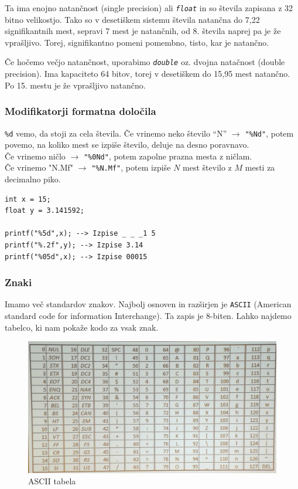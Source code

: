 \documentclass[a4paper, 12pt]{article}
\begin{document}
Ta ima enojno natančnost (single precision) ali \emph{\texttt{float}} in so števila zapisana z 32 bitno velikostjo. Tako so v desetiškem sistemu števila natančna do 7,22 signifikantnih mest, sepravi 7 mest je natančnih, od 8. števila naprej pa je že vprašljivo. Torej, signifikantno pomeni pomembno, tisto, kar je natančno.\

Če hočemo večjo natančnost, uporabimo \emph{\texttt{double}} oz. dvojna natačnost (double precision). Ima kapaciteto 64 bitov, torej v desetiškem do 15,95 mest natančno. Po 15. mestu je že vprašljivo natančno.


\subsubsection{Modifikatorji formatna določila}
\verb|%d| vemo, da stoji za cela števila. Če vrinemo neko število ``N'' $\to$ \texttt{"\%Nd"}, potem povemo, na koliko mest se izpiše število, deluje na desno poravnavo.\\
Če vrinemo ničlo $\to$ \texttt{"\%0Nd"}, potem zapolne prazna mesta z ničlam.\\
Če vrinemo "N.Mf" $\to$ \texttt{"\%N.Mf"}, potem izpiše $N$ mest število z $M$ mesti za decimalno piko.

\begin{lstlisting}
int x = 15;
float y = 3.141592;

printf("%5d",x); --> Izpise _ _ _1 5
printf("%.2f",y); --> Izpise 3.14
printf("%05d",x); --> Izpise 00015
\end{lstlisting} 

\subsubsection{Znaki}
Imamo več standardov znakov. Najbolj osnoven in razširjen je \texttt{ASCII} (American standard code for information Interchange). Ta zapis je 8-biten. Lahko najdemo tabelco, ki nam pokaže kodo za vsak znak.

\begin{figure}[h!]
	\centering
	\includegraphics[width=0.7\linewidth]{images/ascii.jpg}
	\caption{ASCII tabela}
	\label{fig:ascii-tabela }
\end{figure}
\end{document}
